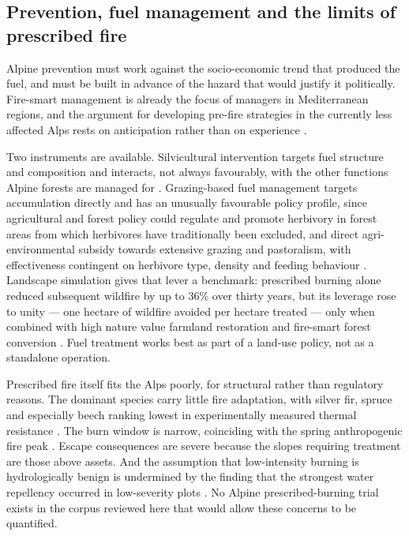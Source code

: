 \documentclass[11pt,a4paper]{article}
\begin{document}
\subsection{Prevention, fuel management and the limits of prescribed fire}

Alpine prevention must work against the socio-economic trend that produced the fuel, and must be built in advance of the hazard that would justify it politically. Fire-smart management is already the focus of managers in Mediterranean regions, and the argument for developing pre-fire strategies in the currently less affected Alps rests on anticipation rather than on experience \citep{gerberding_mapping_2025}.

Two instruments are available. Silvicultural intervention targets fuel structure and composition and interacts, not always favourably, with the other functions Alpine forests are managed for \citep{dinca_timber_2025}. Grazing-based fuel management targets accumulation directly and has an unusually favourable policy profile, since agricultural and forest policy could regulate and promote herbivory in forest areas from which herbivores have traditionally been excluded, and direct agri-environmental subsidy towards extensive grazing and pastoralism, with effectiveness contingent on herbivore type, density and feeding behaviour \citep{rouetleduc_effects_2021}. Landscape simulation gives that lever a benchmark: prescribed burning alone reduced subsequent wildfire by up to 36\% over thirty years, but its leverage rose to unity --- one hectare of wildfire avoided per hectare treated --- only when combined with high nature value farmland restoration and fire-smart forest conversion \citep{pais_optimizing_2023}. Fuel treatment works best as part of a land-use policy, not as a standalone operation.

Prescribed fire itself fits the Alps poorly, for structural rather than regulatory reasons. The dominant species carry little fire adaptation, with silver fir, spruce and especially beech ranking lowest in experimentally measured thermal resistance \citep{mutterer_bark_2026, dupire_vulnerability_2019}. The burn window is narrow, coinciding with the spring anthropogenic fire peak \citep{muller_forest_2020}. Escape consequences are severe because the slopes requiring treatment are those above assets. And the assumption that low-intensity burning is hydrologically benign is undermined by the finding that the strongest water repellency occurred in low-severity plots \citep{negri_wildfire_2026}. No Alpine prescribed-burning trial exists in the corpus reviewed here that would allow these concerns to be quantified.
\end{document}
